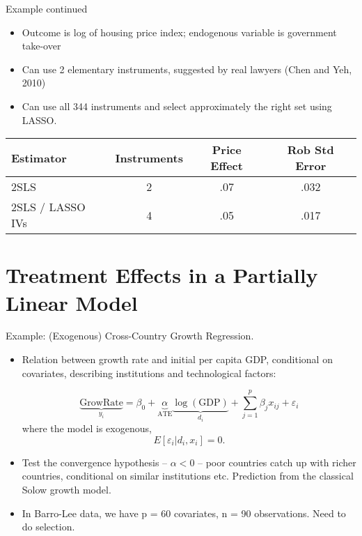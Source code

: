 \documentclass{beamer}
\begin{document}
\begin{frame}{Example continued}
	\begin{itemize}
		\item Outcome is log of housing price index; endogenous variable is
government take-over
\item Can use 2 elementary instruments, suggested by real lawyers
(Chen and Yeh, 2010)
\item Can use all 344 instruments and select approximately the right
set using LASSO.
	\end{itemize}
	
	\begin{tabular}{lccc}
	\hline \hline
	Estimator &Instruments &Price Effect &Rob Std Error\\ \hline
2SLS &2& .07& .032\\ \hline
2SLS / LASSO IVs& 4& .05 &.017\\ \hline \hline
	\end{tabular}
\end{frame}
\section{Treatment Effects in a Partially Linear Model}

\begin{frame}
	Example: (Exogenous) Cross-Country Growth Regression.
	\begin{itemize}
\item Relation between growth rate and initial per capita GDP,
conditional on covariates, describing institutions and
technological factors:

\[ \underbrace{\text{GrowRate}}_{y_i} = \beta_0 + \underbrace{\alpha}_{\text{ATE}} \underbrace{\log (\text{GDP})}_{d_i} + \sum_{j=1}^p \beta_j x_{ij} + \varepsilon_i \] 
where the model is exogenous,
 \[ E[\varepsilon_i| d_i, x_i] = 0. \]
\item Test the convergence hypothesis -- $\alpha < 0$ -- poor countries catch
up with richer countries, conditional on similar institutions etc.
Prediction from the classical Solow growth model.
\item In Barro-Lee data, we have p = 60 covariates, n = 90
observations. Need to do selection.
\end{itemize}
\end{frame}
\end{document}
